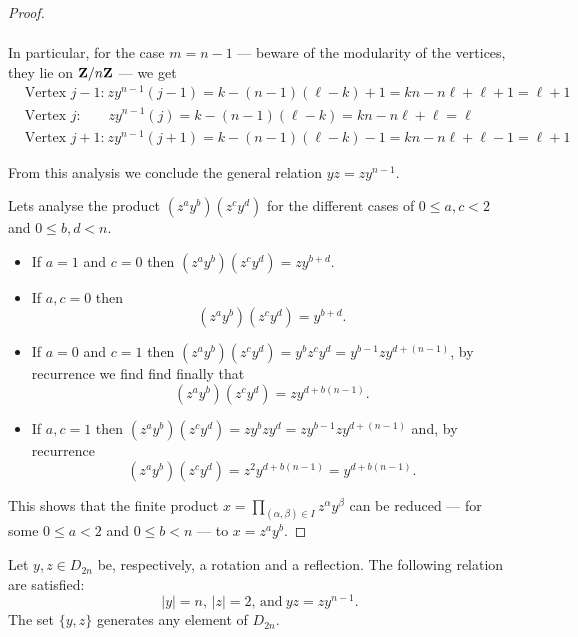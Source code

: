 \begin{proof}
\begin{itemize}
\begin{gather*}
    \end{gather*}
    In particular, for the case \(m = n - 1\) --- beware of the modularity of
    the vertices, they lie on \(\mathbf{Z}/n\mathbf{Z}\) --- we get
    \begin{align*}
      &\text{Vertex } j - 1\text{:}\
      zy^{n-1}(j - 1)
      = k - (n - 1) (\ell - k) + 1
      = k n - n \ell + \ell + 1
      = \ell + 1
      \\
      &\text{Vertex } j\text{:} \qquad
      zy^{n-1}(j)
      = k - (n - 1) (\ell - k)
      = kn - n \ell + \ell
      = \ell
      \\
      &\text{Vertex } j + 1\text{:}\
      zy^{n-1}(j + 1)
      = k - (n - 1) (\ell - k) - 1
      = k n - n \ell + \ell - 1
      = \ell + 1
    \end{align*}
\end{itemize}
From this analysis we conclude the general relation \(y z = z y^{n-1}\).

Lets analyse the product \((z^a y^b)(z^c y^d)\) for the different cases of \(0
\leq a, c < 2\) and \(0 \leq b, d < n\).
\begin{itemize}
  \item If \(a = 1\) and \(c = 0\) then \((z^a y^b)(z^c y^d) = z y^{b + d}\).
  \item If \(a, c = 0\) then
    \[
      (z^a y^b)(z^c y^d) = y^{b + d}.
    \]
  \item If \(a = 0\) and \(c = 1\) then \((z^a y^b)(z^c y^d) = y^b z^c y^d =
    y^{b-1} z y^{d + (n - 1)}\), by recurrence we find find finally that
    \[
      (z^a y^b)(z^c y^d) = z y^{d + b(n - 1)}.
    \]
  \item If \(a, c = 1\) then \((z^a y^b)(z^c y^d) = z y^b z y^d = z y^{b-1} z
    y^{d + (n - 1)}\) and, by recurrence
    \[
      (z^a y^b)(z^c y^d) = z^2 y^{d + b(n - 1)} = y^{d + b(n - 1)}.
    \]
\end{itemize}
This shows that the finite product \(x = \prod_{(\alpha, \beta) \in I}
z^\alpha y^\beta\) can be reduced --- for some \(0 \leq a < 2\) and \(0 \leq b
< n\) --- to \(x = z^a y^b\).
\end{proof}

\begin{corollary}
Let \(y, z \in D_{2n}\) be, respectively, a rotation and a reflection. The
following relation are satisfied:
\[
  |y| = n \text{, } |z| = 2 \text{, and}\ yz = z y^{n-1}.
\]
The set \(\{y, z\}\) generates any element of \(D_{2n}\).
\end{corollary}


